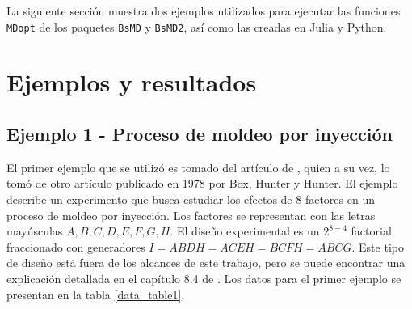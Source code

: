 La siguiente sección muestra dos ejemplos utilizados para ejecutar las funciones \texttt{MDopt} de los paquetes \texttt{BsMD} y \texttt{BsMD2}, así como las creadas en \textsf{Julia} y \textsf{Python}. 

\section{Ejemplos y resultados}

\subsection{Ejemplo 1 - Proceso de moldeo por inyección}

El primer ejemplo que se utilizó es tomado del artículo de \cite{meyer1996}, quien a su vez, lo tomó de otro artículo publicado en 1978 por Box, Hunter y Hunter. El ejemplo describe un experimento que busca estudiar los efectos de 8 factores en un proceso de moldeo por inyección. Los factores se representan con las letras mayúsculas $A, B, C, D, E, F, G, H$. El diseño experimental es un $2^{8-4}$ factorial fraccionado con generadores $I = ABDH = ACEH = BCFH = ABCG$. Este tipo de diseño está fuera de los alcances de este trabajo, pero se puede encontrar una explicación detallada en el capítulo 8.4 de \cite{montgomery2017design}. Los datos para el primer ejemplo se presentan en la tabla \ref{data_table1}. 

